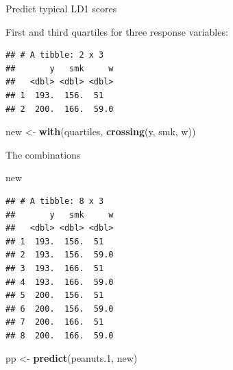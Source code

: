 \documentclass[ignorenonframetext,]{beamer}
\newenvironment{Shaded}{\begin{snugshade}}{\end{snugshade}}
\newcommand{\FloatTok}[1]{\textcolor[rgb]{0.00,0.00,0.81}{#1}}
\newcommand{\KeywordTok}[1]{\textcolor[rgb]{0.13,0.29,0.53}{\textbf{#1}}}
\newcommand{\NormalTok}[1]{#1}
\newcommand{\OperatorTok}[1]{\textcolor[rgb]{0.81,0.36,0.00}{\textbf{#1}}}
\newcommand{\StringTok}[1]{\textcolor[rgb]{0.31,0.60,0.02}{#1}}
\begin{document}
\begin{frame}[fragile]{Predict typical LD1 scores}
\protect\hypertarget{predict-typical-ld1-scores}{}

First and third quartiles for three response variables:

\begin{Shaded}
\end{Shaded}

\begin{verbatim}
## # A tibble: 2 x 3
##       y   smk     w
##   <dbl> <dbl> <dbl>
## 1  193.  156.  51  
## 2  200.  166.  59.0
\end{verbatim}

\begin{Shaded}
\begin{Highlighting}[]
\NormalTok{new <-}\StringTok{ }\KeywordTok{with}\NormalTok{(quartiles, }\KeywordTok{crossing}\NormalTok{(y, smk, w))}
\end{Highlighting}
\end{Shaded}

\end{frame}

\begin{frame}[fragile]{The combinations}
\protect\hypertarget{the-combinations}{}

\begin{Shaded}
\begin{Highlighting}[]
\NormalTok{new}
\end{Highlighting}
\end{Shaded}

\begin{verbatim}
## # A tibble: 8 x 3
##       y   smk     w
##   <dbl> <dbl> <dbl>
## 1  193.  156.  51  
## 2  193.  156.  59.0
## 3  193.  166.  51  
## 4  193.  166.  59.0
## 5  200.  156.  51  
## 6  200.  156.  59.0
## 7  200.  166.  51  
## 8  200.  166.  59.0
\end{verbatim}

\begin{Shaded}
\begin{Highlighting}[]
\NormalTok{pp <-}\StringTok{ }\KeywordTok{predict}\NormalTok{(peanuts}\FloatTok{.1}\NormalTok{, new)}
\end{Highlighting}
\end{Shaded}

\end{frame}
\end{document}
